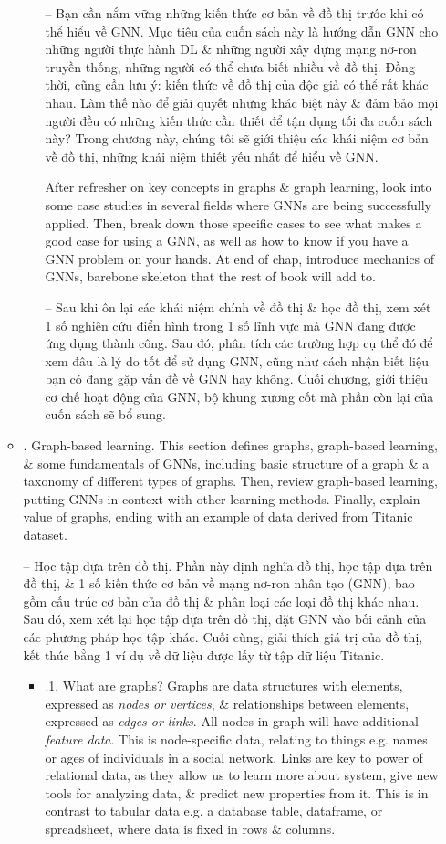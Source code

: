 \documentclass{article}
\begin{document}
\begin{itemize}
\begin{itemize}
\begin{itemize}
            -- Bạn cần nắm vững những kiến thức cơ bản về đồ thị trước khi có thể hiểu về GNN. Mục tiêu của cuốn sách này là hướng dẫn GNN cho những người thực hành DL \& những người xây dựng mạng nơ-ron truyền thống, những người có thể chưa biết nhiều về đồ thị. Đồng thời, cũng cần lưu ý: kiến thức về đồ thị của độc giả có thể rất khác nhau. Làm thế nào để giải quyết những khác biệt này \& đảm bảo mọi người đều có những kiến thức cần thiết để tận dụng tối đa cuốn sách này? Trong chương này, chúng tôi sẽ giới thiệu các khái niệm cơ bản về đồ thị, những khái niệm thiết yếu nhất để hiểu về GNN.

            After refresher on key concepts in graphs \& graph learning, look into some case studies in several fields where GNNs are being successfully applied. Then, break down those specific cases to see what makes a good case for using a GNN, as well as how to know if you have a GNN problem on your hands. At end of chap, introduce mechanics of GNNs, barebone skeleton that the rest of book will add to.

            -- Sau khi ôn lại các khái niệm chính về đồ thị \& học đồ thị, xem xét 1 số nghiên cứu điển hình trong 1 số lĩnh vực mà GNN đang được ứng dụng thành công. Sau đó, phân tích các trường hợp cụ thể đó để xem đâu là lý do tốt để sử dụng GNN, cũng như cách nhận biết liệu bạn có đang gặp vấn đề về GNN hay không. Cuối chương, giới thiệu cơ chế hoạt động của GNN, bộ khung xương cốt mà phần còn lại của cuốn sách sẽ bổ sung.
        \end{itemize}
        \item {. Graph-based learning.} This section defines graphs, graph-based learning, \& some fundamentals of GNNs, including basic structure of a graph \& a taxonomy of different types of graphs. Then, review graph-based learning, putting GNNs in context with other learning methods. Finally, explain value of graphs, ending with an example of data derived from Titanic dataset.

        -- Học tập dựa trên đồ thị. Phần này định nghĩa đồ thị, học tập dựa trên đồ thị, \& 1 số kiến thức cơ bản về mạng nơ-ron nhân tạo (GNN), bao gồm cấu trúc cơ bản của đồ thị \& phân loại các loại đồ thị khác nhau. Sau đó, xem xét lại học tập dựa trên đồ thị, đặt GNN vào bối cảnh của các phương pháp học tập khác. Cuối cùng, giải thích giá trị của đồ thị, kết thúc bằng 1 ví dụ về dữ liệu được lấy từ tập dữ liệu Titanic.
        \begin{itemize}
            \item {.1. What are graphs?} Graphs are data structures with elements, expressed as {\it nodes or vertices}, \& relationships between elements, expressed as {\it edges or links}. All nodes in graph will have additional {\it feature data}. This is node-specific data, relating to things e.g. names or ages of individuals in a social network. Links are key to power of relational data, as they allow us to learn more about system, give new tools for analyzing data, \& predict new properties from it. This is in contrast to tabular data e.g. a database table, dataframe, or spreadsheet, where data is fixed in rows \& columns.


\end{itemize}
\end{itemize}
\end{itemize}
\end{document}
